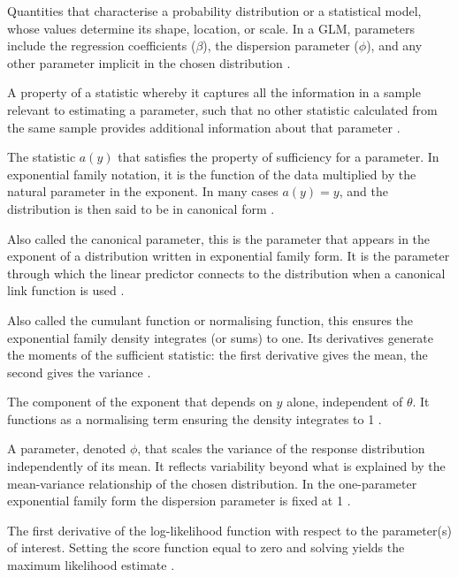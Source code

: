 Quantities that characterise a probability distribution or a statistical model, whose values determine its shape, location, or scale. In a GLM, parameters include the regression coefficients ($\beta$), the dispersion parameter ($\phi$), and any other parameter implicit in the chosen distribution \citep{casella2002}.

A property of a statistic whereby it captures all the information in a sample relevant to estimating a parameter, such that no other statistic calculated from the same sample provides additional information about that parameter \citep{casella2002}.

The statistic $a(y)$ that satisfies the property of sufficiency for a parameter. In exponential family notation, it is the function of the data multiplied by the natural parameter in the exponent. In many cases $a(y)=y$, and the distribution is then said to be in canonical form \citep[p.~2]{nowak_nd}.

Also called the canonical parameter, this is the parameter that appears in the exponent of a distribution written in exponential family form. It is the parameter through which the linear predictor connects to the distribution when a canonical link function is used \citep{mccullagh1989}.

Also called the cumulant function or normalising function, this ensures the exponential family density integrates (or sums) to one. Its derivatives generate the moments of the sufficient statistic: the first derivative gives the mean, the second gives the variance \citep{mccullagh1989}.

The component of the exponent that depends on $y$ alone, independent of $\theta$. It functions as a normalising term ensuring the density integrates to 1 \citep{mccullagh1989}.

A parameter, denoted $\phi$, that scales the variance of the response distribution independently of its mean. It reflects variability beyond what is explained by the mean-variance relationship of the chosen distribution. In the one-parameter exponential family form the dispersion parameter is fixed at 1 \citep{dobson2018}.

The first derivative of the log-likelihood function with respect to the parameter(s) of interest. Setting the score function equal to zero and solving yields the maximum likelihood estimate \citep{casella2002}.

